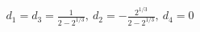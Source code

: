 \documentclass[preview]{standalone}
\begin{document}
\begin{align*}
d_1=d_3=\frac{1}{2-2^{1/3}},\ d_2=-\frac{2^{1/3}}{2-2^{1/3}},\ d_4=0
\end{align*}
\end{document}
